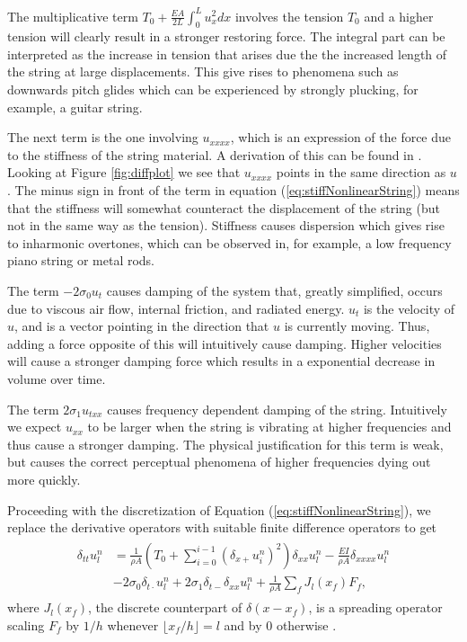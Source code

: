 \documentclass{article}
\begin{document}
\noindent The multiplicative term $T_0 + \frac{E A}{2L} \int_0^L u_x^2 dx$ involves the tension $T_0$ and a higher tension will clearly result in a stronger restoring force.
The integral part can be interpreted as the increase in tension that arises due the the increased length of the string at large displacements\cite[Chapter~5]{fletcher_physics_1998}.
This give rises to phenomena such as downwards pitch glides which can be experienced by strongly plucking, for example, a guitar string.

The next term is the one involving $u_{xxxx}$, which is an expression of the force due to the stiffness of the string material.
A derivation of this can be found in \cite[Chapter~2]{fletcher_physics_1998}.
Looking at Figure \ref{fig:diffplot} we see that $u_{xxxx}$ points in the same direction as $u$. The minus sign in front of the term in equation (\ref{eq:stiffNonlinearString}) means that the stiffness will somewhat counteract the displacement of the string (but not in the same way as the tension).
Stiffness causes dispersion which gives rise to inharmonic overtones, which can be observed in, for example, a low frequency piano string or metal rods.

The term $-2 \sigma_0 u_t$ causes damping of the system that, greatly simplified, occurs due to viscous air flow, internal friction, and radiated energy\cite[Chapter~2]{fletcher_physics_1998}. 
$u_t$ is the velocity of $u$, and is a vector pointing in the direction that $u$ is currently moving. Thus, adding a force opposite of this will intuitively cause damping.
Higher velocities will cause a stronger damping force which results in a exponential decrease in volume over time.

The term $2 \sigma_1 u_{txx}$ causes frequency dependent damping of the string.
Intuitively we expect $u_{xx}$ to be larger when the string is vibrating at higher frequencies and thus cause a stronger damping.
The physical justification for this term is weak, but causes the correct perceptual phenomena of higher frequencies dying out more quickly\cite{bensa_simulation_2003}.

Proceeding with the discretization of Equation (\ref{eq:stiffNonlinearString}), we replace the derivative operators with suitable finite difference operators to get
\begin{align}
  \begin{split}
    \delta_{tt} u^n_l &= \frac{1}{\rho A} \left(T_0 + \sum^{i-1}_{i=0} (\delta_{x+} u^n_i)^2 \right)\delta_{xx}u^n_l - \frac{E I}{\rho A} \delta_{xxxx} u^n_l\\
    &- 2 \sigma_0 \delta_{t\cdot} u^n_l + 2 \sigma_1 \delta_{t-} \delta_{xx}u^n_l + \frac{1}{\rho A} \sum_fJ_l(x_f)F_f,
  \end{split}
\end{align}
where $J_l(x_f)$, the discrete counterpart of $\delta(x-x_f)$, is a spreading operator scaling $F_f$ by $1/h$ whenever $\lfloor x_f / h \rfloor = l$ and by $0$ otherwise \cite[Chapter 5]{bilbao_numerical_2009}.
\end{document}
